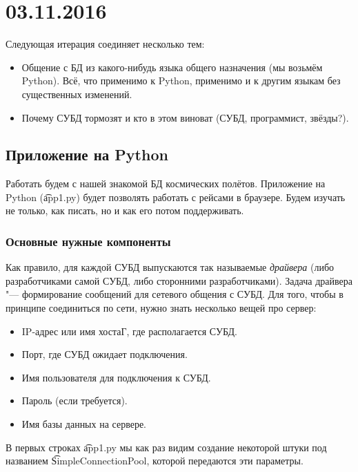 \chapter{03.11.2016}

	Следующая итерация соединяет несколько тем:
	\begin{itemize}
		\item
			Общение с БД из какого-нибудь языка общего назначения (мы возьмём Python).
			Всё, что применимо к Python, применимо и к другим языкам без существенных изменений.
		\item
			Почему СУБД тормозят и кто в этом виноват (СУБД, программист, звёзды?).
	\end{itemize}

\section{Приложение на Python}
	Работать будем с нашей знакомой БД космических полётов.
	Приложение на Python (\t{app1.py}) будет позволять работать с рейсами в браузере.
	Будем изучать не только, как писать, но и как его потом поддерживать.

\subsection{Основные нужные компоненты}
	Как правило, для каждой СУБД выпускаются так называемые \textit{драйвера}
	(либо разработчиками самой СУБД, либо сторонними разработчиками).
	Задача драйвера "--- формирование сообщений для сетевого общения с СУБД.
	Для того, чтобы в принципе соединиться по сети, нужно знать несколько вещей про сервер:
	\begin{itemize}
		\item IP-адрес или имя хостаГ, где располагается СУБД.
		\item Порт, где СУБД ожидает подключения.
		\item Имя пользователя для подключения к СУБД.
		\item Пароль (если требуется).
		\item Имя базы данных на сервере.
	\end{itemize}
	В первых строках \t{app1.py} мы как раз видим создание некоторой штуки под названием
	\t{SimpleConnectionPool}, которой передаются эти параметры.

